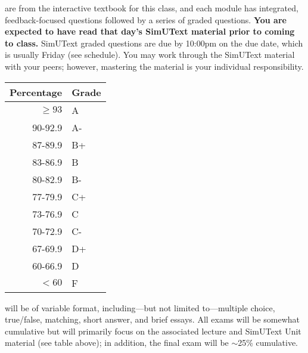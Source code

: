 \documentclass{tufte-handout}
\begin{document}
\newpage

 are from the interactive textbook for this class, and each module has integrated, feedback-focused questions followed by a series of graded questions. \textbf{You are expected to have read that day's SimUText material prior to coming to class. } SimUText graded questions are due by 10:00pm on the due date, which is usually Friday (see schedule). You may work through the SimUText material with your peers; however, mastering the material is your individual responsibility.


\begin{margintable}
\begin{tabular}{rl}
Percentage & Grade \\
\hline 
$\ge93$ & A \\
90-92.9 & A- \\
87-89.9 & B+ \\
83-86.9 & B \\
80-82.9 & B- \\
77-79.9 & C+ \\
73-76.9 & C \\
70-72.9 & C- \\
67-69.9 & D+ \\
60-66.9 & D \\
$<60$ & F \\
\hline
\end{tabular}
\end{margintable}

 will be of variable format, including---but not limited to---multiple choice, true/false, matching, short answer, and brief essays. All exams will be somewhat cumulative but will primarily focus on the associated lecture and SimUText Unit material (see table above); in addition, the final exam will be $\sim$25\% cumulative. 
\end{document}
